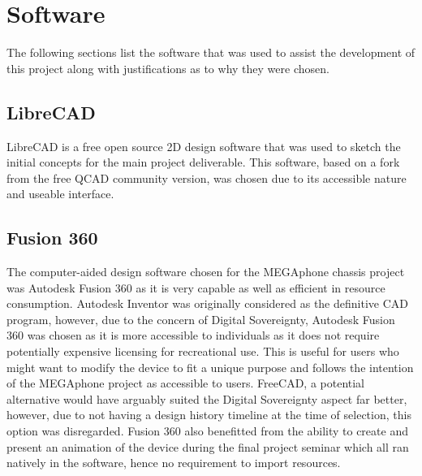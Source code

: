 \section{Software}

The following sections list the software that was used to assist the development of this project along with justifications as to why they were chosen.


\subsection{LibreCAD}

LibreCAD is a free open source 2D design software that was used to sketch the initial concepts for the main project deliverable. 
This software, based on a fork from the free QCAD community version, was chosen due to its accessible nature and useable interface.


\subsection{Fusion 360}

The computer-aided design software chosen for the MEGAphone chassis project was Autodesk Fusion 360 as it is very capable as well as efficient in resource consumption. 
Autodesk Inventor was originally considered as the definitive CAD program, however, due to the concern of Digital Sovereignty, Autodesk Fusion 360 was chosen as it is more accessible to individuals as it does not require potentially expensive licensing for recreational use. 
This is useful for users who might want to modify the device to fit a unique purpose and follows the intention of the MEGAphone project as accessible to users.
FreeCAD, a potential alternative would have arguably suited the Digital Sovereignty aspect far better, however, due to not having a design history timeline at the time of selection, this option was disregarded.
Fusion 360 also benefitted from the ability to create and present an animation of the device during the final project seminar which all ran natively in the software, hence no requirement to import resources.


